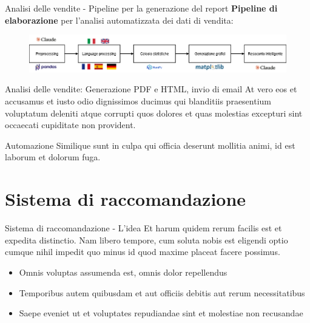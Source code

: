 \documentclass{beamer}
\begin{document}
	\begin{frame}{Analisi delle vendite - Pipeline per la generazione del report}
		\textbf{Pipeline di elaborazione} per l'analisi automatizzata dei dati di vendita:

		\begin{figure}
			\centering
			\includegraphics[width=\textwidth]{Diagramma pipeline analisi delle vendite.png}
		\end{figure}
	\end{frame}

	\begin{frame}{Analisi delle vendite: Generazione PDF e HTML, invio di email}
		At vero eos et accusamus et iusto odio dignissimos ducimus qui blanditiis praesentium voluptatum deleniti atque corrupti quos dolores et quas molestias excepturi sint occaecati cupiditate non provident.

		\begin{alertblock}{Automazione}
			Similique sunt in culpa qui officia deserunt mollitia animi, id est laborum et dolorum fuga.
		\end{alertblock}
	\end{frame}


	\section{Sistema di raccomandazione}

	\begin{frame}{Sistema di raccomandazione - L'idea}
		Et harum quidem rerum facilis est et expedita distinctio. Nam libero tempore, cum soluta nobis est eligendi optio cumque nihil impedit quo minus id quod maxime placeat facere possimus.

		\begin{itemize}
			\item Omnis voluptas assumenda est, omnis dolor repellendus
			\item Temporibus autem quibusdam et aut officiis debitis aut rerum necessitatibus
			\item Saepe eveniet ut et voluptates repudiandae sint et molestiae non recusandae
		\end{itemize}
	\end{frame}
\end{document}
